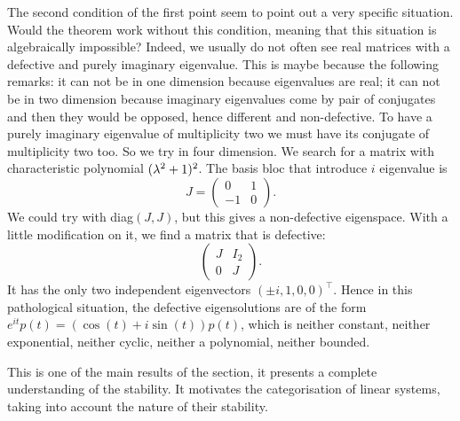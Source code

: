 \begin{exemple}
     The second condition of the first point seem to point out a very specific situation. Would the theorem work without this condition, meaning that this situation is algebraically impossible? Indeed, we usually do not often see real matrices with a defective and purely imaginary eigenvalue. This is maybe because the following remarks: it can not be in one dimension because eigenvalues are real; it can not be in two dimension because imaginary eigenvalues come by pair of conjugates and then they would be opposed, hence different and non-defective. To have a purely imaginary eigenvalue of multiplicity two we must have its conjugate of multiplicity two too. So we try in four dimension. We search for a matrix with characteristic polynomial $(\lambda^2+1)^2$. The basis bloc that introduce $i$ eigenvalue is 
     $$J=\begin{pmatrix}0&1\\-1&0\end{pmatrix}.$$
     We could try with diag$(J,J)$, but this gives a non-defective eigenspace. With a little modification on it, we find a matrix that is defective:
     $$\begin{pmatrix}J&I_2\\0&J\end{pmatrix}.$$
     It has the only two independent eigenvectors $(\pm i,1,0,0)^\top$. Hence in this pathological situation, the defective eigensolutions are of the form $e^{it}p(t)=(\cos(t)+i\sin(t))p(t)$, which is neither constant, neither exponential, neither cyclic, neither a polynomial, neither bounded.
\end{exemple}
This is one of the main results of the section, it presents a complete understanding of the stability. It motivates the categorisation of linear systems, taking into account the nature of their stability.
